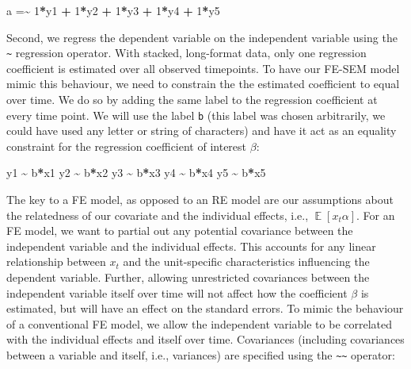 \documentclass[]{interact}
\theoremstyle{plain}%
\theoremstyle{definition}
\theoremstyle{remark}
\newenvironment{Shaded}{\begin{snugshade}}{\end{snugshade}}
\newcommand{\DecValTok}[1]{\textcolor[rgb]{0.00,0.00,0.81}{#1}}
\newcommand{\ErrorTok}[1]{\textcolor[rgb]{0.64,0.00,0.00}{\textbf{#1}}}
\newcommand{\NormalTok}[1]{#1}
\newcommand{\OperatorTok}[1]{\textcolor[rgb]{0.81,0.36,0.00}{\textbf{#1}}}
\newcommand{\StringTok}[1]{\textcolor[rgb]{0.31,0.60,0.02}{#1}}
\begin{document}
\begin{Shaded}
\begin{Highlighting}[]
\NormalTok{a =}\ErrorTok{\textasciitilde{}}\StringTok{ }\DecValTok{1}\OperatorTok{*}\NormalTok{y1 }\OperatorTok{+}\StringTok{ }\DecValTok{1}\OperatorTok{*}\NormalTok{y2 }\OperatorTok{+}\StringTok{ }\DecValTok{1}\OperatorTok{*}\NormalTok{y3 }\OperatorTok{+}\StringTok{ }\DecValTok{1}\OperatorTok{*}\NormalTok{y4 }\OperatorTok{+}\StringTok{ }\DecValTok{1}\OperatorTok{*}\NormalTok{y5}
\end{Highlighting}
\end{Shaded}

\doublespacing

Second, we regress the dependent variable on the independent variable
using the \texttt{\textasciitilde{}} regression operator. With stacked,
long-format data, only one regression coefficient is estimated over all
observed timepoints. To have our FE-SEM model mimic this behaviour, we
need to constrain the the estimated coefficient to equal over time. We
do so by adding the same label to the regression coefficient at every
time point. We will use the label \texttt{b} (this label was chosen
arbitrarily, we could have used any letter or string of characters) and
have it act as an equality constraint for the regression coefficient of
interest \(\beta\):

\singlespacing

\begin{Shaded}
\begin{Highlighting}[]
\NormalTok{y1 }\OperatorTok{\textasciitilde{}}\StringTok{ }\NormalTok{b}\OperatorTok{*}\NormalTok{x1}
\NormalTok{y2 }\OperatorTok{\textasciitilde{}}\StringTok{ }\NormalTok{b}\OperatorTok{*}\NormalTok{x2 }
\NormalTok{y3 }\OperatorTok{\textasciitilde{}}\StringTok{ }\NormalTok{b}\OperatorTok{*}\NormalTok{x3}
\NormalTok{y4 }\OperatorTok{\textasciitilde{}}\StringTok{ }\NormalTok{b}\OperatorTok{*}\NormalTok{x4}
\NormalTok{y5 }\OperatorTok{\textasciitilde{}}\StringTok{ }\NormalTok{b}\OperatorTok{*}\NormalTok{x5}
\end{Highlighting}
\end{Shaded}

\doublespacing

The key to a FE model, as opposed to an RE model are our assumptions
about the relatedness of our covariate and the individual effects, i.e.,
\(\mathop{\mathrm{\mathbb{E}}}[x_{t}\alpha]\). For an FE model, we want
to partial out any potential covariance between the independent variable
and the individual effects. This accounts for any linear relationship
between \(x_{t}\) and the unit-specific characteristics influencing the
dependent variable. Further, allowing unrestricted covariances between
the independent variable itself over time will not affect how the
coefficient \(\beta\) is estimated, but will have an effect on the
standard errors. To mimic the behaviour of a conventional FE model, we
allow the independent variable to be correlated with the individual
effects and itself over time. Covariances (including covariances between
a variable and itself, i.e., variances) are specified using the
\texttt{\textasciitilde{}\textasciitilde{}} operator:
\end{document}
